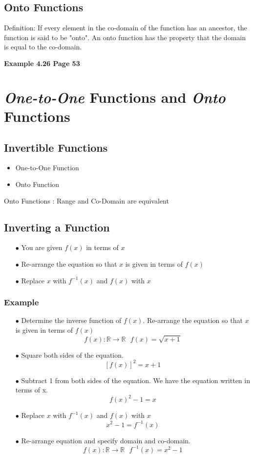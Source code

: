 \documentclass[]{report}
\begin{document}
\begin{enumerate}
\subsection{Onto Functions}
Definition: If every element in the co-domain of the function has an ancestor, the function is said to be "onto".
An onto function has the property that the domain is equal to the co-domain.


\textbf{Example 4.26 Page 53}

\section{\textit{One-to-One} Functions and \textit{Onto} Functions}

\subsection{Invertible Functions}
\begin{itemize}
\item One-to-One Function
\item Onto Function
\end{itemize}

Onto Functions : Range and Co-Domain are equivalent

\subsection{Inverting a Function}

\begin{itemize}
\item[$\bullet$] You are given $f(x)$ in terms of $x$
\item[$\bullet$] Re-arrange the equation so that $x$ is given in terms of $f(x)$
\item[$\bullet$] Replace $x$ with $f^{-1}(x)$ and $f(x)$ with $x$
\end{itemize}

\subsubsection{Example}
\begin{itemize}
\item[$\bullet$]Determine the inverse function of $f(x)$. Re-arrange the equation so that $x$ is given in terms of $f(x)$
\[  f(x): \mathbb{R} \rightarrow \mathbb{R}  \mbox{   } f(x)  = \sqrt{x+1} \]
\item[$\bullet$] Square both sides of the equation.
\[[f(x)]^2 = x+1 \]
\item[$\bullet$] Subtract 1 from both sides of the equation. We have the equation written in terms of x.
\[f(x)^2-1 = x \]
\item[$\bullet$] Replace $x$ with $f^{-1}(x)$ and $f(x)$ with $x$
\[x^2-1 = f^{-1}(x) \]
\item[$\bullet$] 
Re-arrange equation and specify domain and co-domain.
\[ f(x): \mathbb{R} \rightarrow \mathbb{R}  \mbox{   }  f^{-1}(x) = x^2-1  \]
\end{itemize}
\newpage

\end{enumerate}
\end{document}
